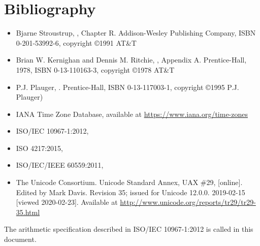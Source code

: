 
\chapter{Bibliography}

\begin{itemize}
\renewcommand{\labelitemi}{---}
\item
  Bjarne Stroustrup,
  , Chapter R.
  Addison-Wesley Publishing Company, ISBN 0-201-53992-6, copyright \copyright 1991 AT\&T
\item
  Brian W. Kernighan and Dennis M. Ritchie,
  , Appendix A.
  Prentice-Hall, 1978, ISBN 0-13-110163-3, copyright \copyright 1978 AT\&T
\item
  P.J. Plauger,
  .
  Prentice-Hall, ISBN 0-13-117003-1, copyright \copyright 1995 P.J. Plauger)
\item
  IANA Time Zone Database,
  available at \url{https://www.iana.org/time-zones}
\item
  ISO/IEC 10967-1:2012,
\item
  ISO 4217:2015,
\item
  ISO/IEC/IEEE 60559:2011, 
\item
  The Unicode Consortium. Unicode Standard Annex, UAX \#29,
   [online].
  Edited by Mark Davis. Revision 35; issued for Unicode 12.0.0. 2019-02-15 [viewed 2020-02-23].
  Available at \url{http://www.unicode.org/reports/tr29/tr29-35.html}
\end{itemize}

The arithmetic specification described in ISO/IEC 10967-1:2012 is
called  in this document.

\let\realglossitem\glossitem
\renewcommand{\glossitem}[4]{\hangpara{4em}{1}\realglossitem{#1}{#2}{#3}{#4}}

\clearpage
\renewcommand{\glossaryname}{Cross references}
\renewcommand{\preglossaryhook}{This annex lists each clause or subclause label and the
corresponding clause or subclause number and page number, in alphabetical order by label.\\}
\twocolglossary
\renewcommand{\leftmark}{\glossaryname}
{
\raggedright
\printglossary[xrefindex]
}

